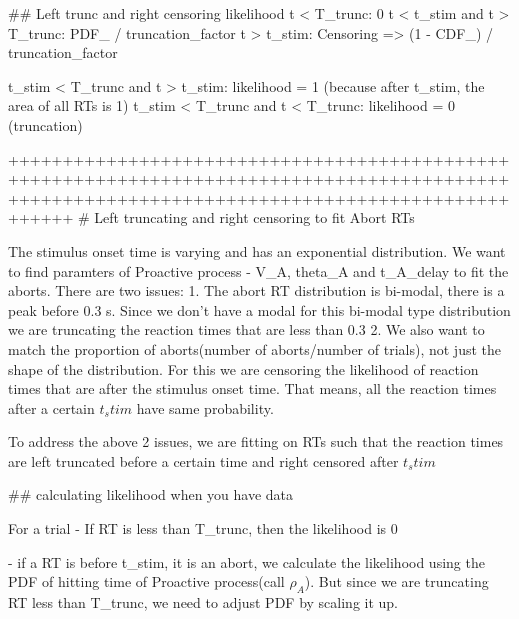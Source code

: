 ## Left trunc and right censoring likelihood
t < T_trunc: 0
t < t_stim and t > T_trunc: PDF_{} / truncation_factor
t > t_stim: Censoring => (1 - CDF_{}) / truncation_factor

t_stim < T_trunc and t > t_stim: likelihood = 1 (because after t_stim, the area of all RTs is 1)
t_stim < T_trunc and t < T_trunc: likelihood = 0 (truncation)


























++++++++++++++++++++++++++++++++++++++++++++++++++++++++++++++++++++++++++++++++++++++++++++++++++++++++++++++++++++++++++++++++++++++++++++++++
# Left truncating and right censoring to fit Abort RTs

The stimulus onset time is varying and has an exponential distribution. We want to find paramters of Proactive process 
- V_A, theta_A and t_A_delay to fit the aborts. There are two issues:
1. The abort RT distribution is bi-modal, there is a peak before 0.3 s. Since we don't have a modal for this bi-modal type distribution
we are truncating the reaction times that are less than 0.3
2. We also want to match the proportion of aborts(number of aborts/number of trials), not just the shape of the distribution. 
For this we are censoring the likelihood of reaction times that are after the stimulus onset time. That means, all the reaction times
after a certain  $t_stim$ have same probability.


To address the above 2 issues, we are fitting on RTs such that the reaction times are left truncated before a certain time
 and right censored after $t_stim$


## calculating likelihood when you have data

For a trial
- If RT is less than T_trunc, then the likelihood is 0

- if a RT is before t_stim, it is an abort, we calculate the likelihood using the PDF of hitting time of Proactive process(call $\rho_A$).
But since we are truncating RT less than T_trunc, we need to adjust PDF by scaling it up. 



